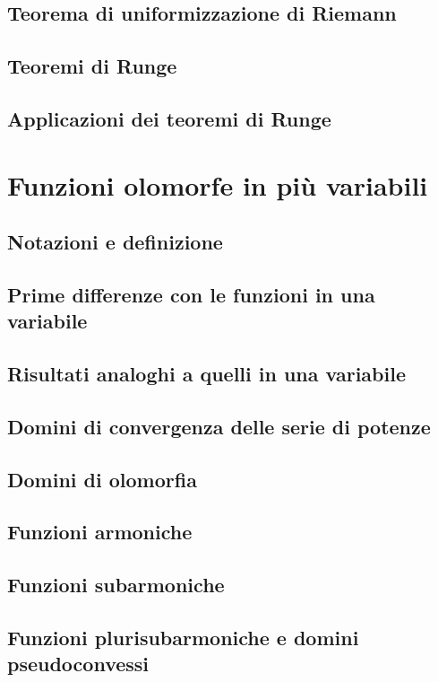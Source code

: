 \documentclass{article}
\begin{document}
\subsection{Teorema di uniformizzazione di Riemann}


\subsection{Teoremi di Runge}


\subsection{Applicazioni dei teoremi di Runge}


\newpage

\section{Funzioni olomorfe in più variabili}

\subsection{Notazioni e definizione}


\subsection{Prime differenze con le funzioni in una variabile}


\subsection{Risultati analoghi a quelli in una variabile}


\subsection{Domini di convergenza delle serie di potenze}


\subsection{Domini di olomorfia}


\subsection{Funzioni armoniche}


\subsection{Funzioni subarmoniche}


\subsection{Funzioni plurisubarmoniche e domini pseudoconvessi}

\end{document}
